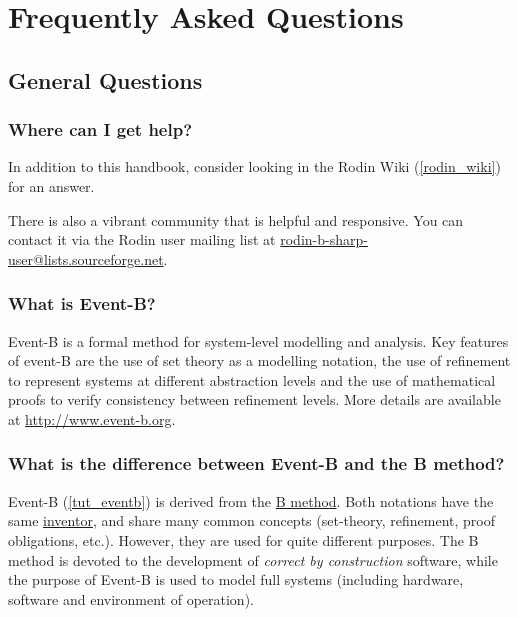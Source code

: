 \chapter{Frequently Asked Questions}
\label{faq}

\section{General Questions}

\subsection{Where can I get help?}
\label{faq_getting_help}

In addition to this handbook, consider looking in the Rodin Wiki (\ref{rodin_wiki}) for an answer.

There is also a vibrant community that is helpful and responsive.  You can contact it via the Rodin user mailing list at \href{mailto:rodin-b-sharp-user@lists.sourceforge.net}{rodin-b-sharp-user@lists.sourceforge.net}.

\subsection{What is Event-B?}

Event-B is a formal method for system-level modelling and analysis. Key features of event-B are the use of set theory as a modelling notation, the use of refinement to represent systems at different abstraction levels and the use of mathematical proofs to verify consistency between refinement levels.
More details are available at \url{http://www.event-b.org}.

\subsection{What is the difference between Event-B and the B method?}

Event-B (\ref{tut_eventb}) is derived from the \href{http://en.wikipedia.org/wiki/B-Method}{B method}. Both notations have the same \href{http://en.wikipedia.org/wiki/Jean-Raymond_Abrial}{inventor}, and share many common concepts (set-theory, refinement, proof obligations, etc.). However, they are used for quite different purposes. The B method is devoted to the development of \textit{correct by construction} software, while the purpose of Event-B is used to model full systems (including hardware, software and environment of operation).

